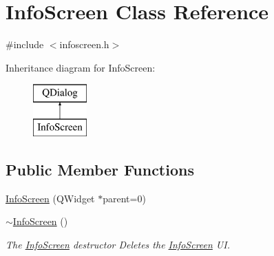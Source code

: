 \hypertarget{class_info_screen}{\section{Info\-Screen Class Reference}
\label{class_info_screen}
}


{\ttfamily \#include $<$infoscreen.\-h$>$}

Inheritance diagram for Info\-Screen\-:\begin{figure}[H]
\begin{center}
\leavevmode
\includegraphics[height=2.000000cm]{class_info_screen}
\end{center}
\end{figure}
\subsection*{Public Member Functions}
\begin{DoxyCompactItemize}
\item 
\hyperlink{class_info_screen_a334bc1b328e13d04889b2f166806de9e}{Info\-Screen} (Q\-Widget $\ast$parent=0)
\item 
\hyperlink{class_info_screen_adc57e13bff37154e1db3346d1ef5c77a}{$\sim$\-Info\-Screen} ()
\begin{DoxyCompactList}\small\item\em The \hyperlink{class_info_screen}{Info\-Screen} destructor Deletes the \hyperlink{class_info_screen}{Info\-Screen} U\-I. \end{DoxyCompactList}\end{DoxyCompactItemize}


